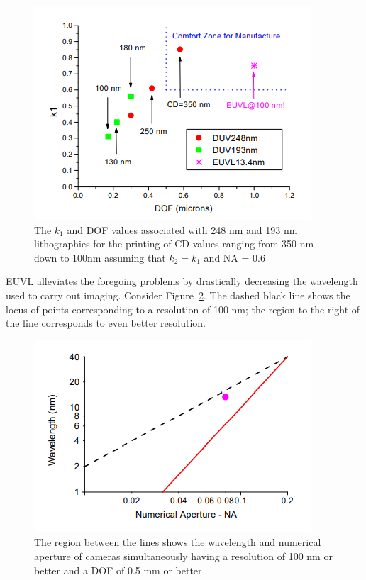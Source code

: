 \documentclass[12pt,a4paper]{report}
\begin{document}
\begin{figure}[H]
  \centering
  \includegraphics[scale=1]{whyeuvl.png}
  \caption{
    \centering The $k_1$ and DOF values associated with 248
  nm and 193 nm lithographies for the printing of CD
  values ranging from 350 nm down to 100nm assuming
  that $k_2 = k_1$ and NA = 0.6}
  \label{euv1}
  \end{figure}

EUVL alleviates the foregoing problems by drastically
decreasing the wavelength used to carry out imaging.
Consider Figure~\ref{euv2}. The dashed black line shows the
locus of points corresponding to a resolution of 100 nm;
the region to the right of the line corresponds to even
better resolution.

\begin{figure}[H]
  \centering
  \includegraphics[scale=1]{whyeuvl2.png}
  \caption{
    \centering The region between the lines shows the
    wavelength and numerical aperture of cameras
    simultaneously having a resolution of 100 nm or better
    and a DOF of 0.5 mm or better
    }
  \label{euv2}
  \end{figure}
\end{document}

